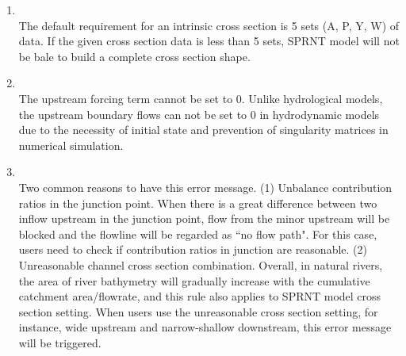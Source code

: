 \documentclass[12pt, letterpaper]{article}
\begin{document}
\begin{flushleft}
\begin{enumerate}
\item \textbf{\color{red}{Bummer: error reading 4D data specified in line XX, requires at least 5 points.}}\\
The default requirement for an intrinsic cross section is 5 sets (A, P, Y, W) of data. If the given cross section data is less than 5 sets, SPRNT model will not be bale to build a complete cross section shape.

\item \textbf{\color{red}{== tchk == node ``XXXX\_XXXX" requires upstreaming Q.}}\\
The upstream forcing term cannot be set to 0. \newline
Unlike hydrological models, the upstream boundary flows can not be set to 0 in hydrodynamic models due to the necessity of initial state  and prevention of singularity matrices in numerical simulation. 

\item \textbf{\color{red}{== tchk == node ``XXXX\_XXXX" no flow path to downstream.}}\\
Two common reasons to have this error message. (1) Unbalance contribution ratios in the junction point. When there is a great difference between two inflow upstream in the junction point, flow from the minor upstream will be blocked and the flowline will be regarded as ``no flow path". For this case, users need to check if contribution ratios in junction are reasonable. (2) Unreasonable channel cross section combination. Overall, in natural rivers, the area of river bathymetry will gradually increase with the cumulative catchment area/flowrate, and this rule also applies to SPRNT model cross section setting. When users use the unreasonable cross section setting, for instance, wide upstream and narrow-shallow downstream, this error message will be triggered.  

\end{enumerate}
\end{flushleft} %
\newpage
\end{document}
